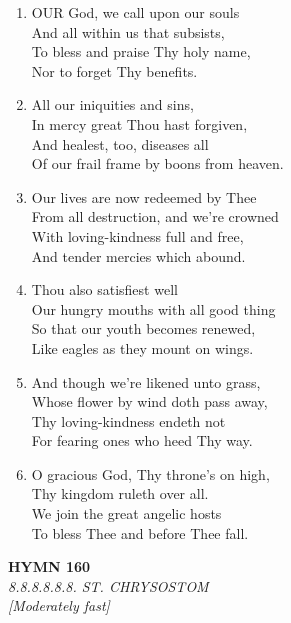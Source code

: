 \documentclass[11pt,a4paper]{article}
\begin{document}
\begin{enumerate}
    \item OUR God, we call upon our souls \\
        And all within us that subsists, \\
        To bless and praise Thy holy name, \\
        Nor to forget Thy benefits.

    \item All our iniquities and sins, \\
        In mercy great Thou hast forgiven, \\
        And healest, too, diseases all \\
        Of our frail frame by boons from heaven.

    \item Our lives are now redeemed by Thee \\
        From all destruction, and we're crowned \\
        With loving-kindness full and free, \\
        And tender mercies which abound.

    \item Thou also satisfiest well \\
        Our hungry mouths with all good thing \\
        So that our youth becomes renewed, \\
        Like eagles as they mount on wings.

    \item And though we're likened unto grass, \\
        Whose flower by wind doth pass away, \\
        Thy loving-kindness endeth not \\
        For fearing ones who heed Thy way.

    \item O gracious God, Thy throne's on high, \\
        Thy kingdom ruleth over all. \\
        We join the great angelic hosts \\
        To bless Thee and before Thee fall.

\end{enumerate}

\newpage
\begin{center}
    {\Large \textbf{HYMN 160}}
    \\
    \textit{8.8.8.8.8.8. ST. CHRYSOSTOM}
    \\
    \textit{\small [Moderately fast]}
\end{center}
\vspace{1em}
\end{document}

